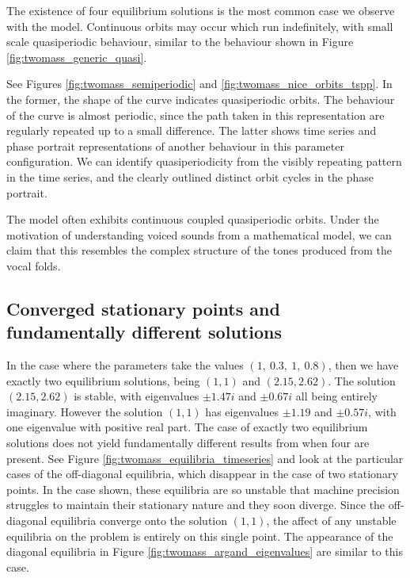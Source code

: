 The existence of four equilibrium solutions is the most common case we observe with the model.
Continuous orbits may occur which run indefinitely, with small scale quasiperiodic behaviour,
similar to the behaviour shown in Figure \ref{fig:twomass_generic_quasi}.

See Figures \ref{fig:twomass_semiperiodic} and \ref{fig:twomass_nice_orbits_tspp}.
In the former, the shape of the curve indicates quasiperiodic orbits.
The behaviour of the curve is almost periodic, since the path taken in this representation are regularly repeated up to a small difference.
The latter shows time series and phase portrait representations of another behaviour in this parameter configuration.
We can identify quasiperiodicity from the visibly repeating pattern in the time series,
and the clearly outlined distinct orbit cycles in the phase portrait.

The model often exhibits continuous coupled quasiperiodic orbits.
Under the motivation of understanding voiced sounds from a mathematical model,
we can claim that this resembles the complex structure of the tones produced from the vocal folds.

\subsection{Converged stationary points and fundamentally different solutions}

In the case where the parameters take the values \((1,~0.3,~1,~0.8)\),
then we have exactly two equilibrium solutions,
being \((1,1)\) and \((2.15,2.62)\).
The solution \((2.15,2.62)\) is stable, with eigenvalues $\pm 1.47i$ and $\pm 0.67i$ all being entirely imaginary.
However the solution \((1,1)\) has eigenvalues $\pm 1.19$ and $\pm 0.57i$, with one eigenvalue with positive real part. %
The case of exactly two equilibrium solutions does not yield fundamentally different results from when four are present.
See Figure \ref{fig:twomass_equilibria_timeseries} and look at the particular cases of the off-diagonal equilibria,
which disappear in the case of two stationary points.
In the case shown, these equilibria are so unstable that machine precision struggles to maintain their stationary nature and they soon diverge.
Since the off-diagonal equilibria converge onto the solution \((1,1)\),
the affect of any unstable equilibria on the problem is entirely on this single point.
The appearance of the diagonal equilibria in Figure \ref{fig:twomass_argand_eigenvalues} are similar to this case.

